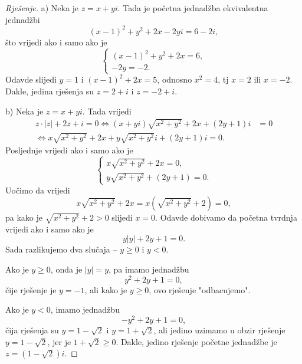 \begin{proof}[Rješenje]
a) Neka je \(z=x+yi\). Tada je početna jednadžba ekvivalentna jednadžbi \[(x-1)^2+y^2+2x-2yi=6-2i,\]
što vrijedi ako i samo ako je
\[\begin{cases}
(x-1)^2+y^2+2x=6,\\
-2y=-2.
\end{cases}\]
Odavde slijedi \(y=1\) i \((x-1)^2+2x=5\), odnosno \(x^2=4\), tj \(x=2\) ili \(x=-2\). Dakle, jedina rješenja su \(z=2+i\) i \(z=-2+i\).

b) Neka je \(z=x+yi\). Tada vrijedi
\begin{align*}
z\cdot |z|+2z+i=0\Leftrightarrow (x+yi)\sqrt{x^2+y^2}+2x+(2y+1)i&=0\\
\Leftrightarrow x\sqrt{x^2+y^2}+2x+y\sqrt{x^2+y^2}i+(2y+1)i=0.
\end{align*}
Posljednje vrijedi ako i samo ako je
\[\begin{cases}
x\sqrt{x^2+y^2}+2x=0,\\
y\sqrt{x^2+y^2}+(2y+1)=0.
\end{cases}\]
Uočimo da vrijedi \[x\sqrt{x^2+y^2}+2x=x(\sqrt{x^2+y^2}+2)=0,\] pa kako je \(\sqrt{x^2+y^2}+2>0\) slijedi \(x=0\). Odavde dobivamo da početna tvrdnja vrijedi ako i samo ako je 
\[y|y|+2y+1=0.\] Sada razlikujemo dva slučaja -- \(y\geq 0\) i \(y<0\).

Ako je \(y\geq 0\), onda je \(|y|=y\), pa imamo jednadžbu \[y^2+2y+1=0,\] čije rješenje je \(y=-1\), ali kako je \(y\geq 0\), ovo rješenje "odbacujemo". 

Ako je \(y<0\), imamo jednadžbu \[-y^2+2y+1=0,\] čija rješenja su \(y=1-\sqrt{2}\) i \(y=1+\sqrt{2}\), ali jedino uzimamo u obzir rješenje \(y=1-\sqrt{2}\), jer je \(1+\sqrt{2}\geq 0\). Dakle, jedino rješenje početne jednadžbe je \(z=(1-\sqrt{2})i\).
\end{proof}
